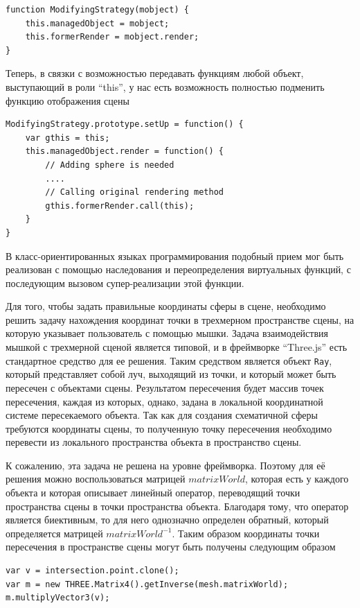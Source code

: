 \documentclass[14pt, a4paper]{extarticle}
\begin{document}
\begin{lstlisting}
function ModifyingStrategy(mobject) {
    this.managedObject = mobject;
    this.formerRender = mobject.render;
}
\end{lstlisting}

Теперь, в связки с возможностью передавать функциям любой объект,
выступающий в роли ``this'', у нас есть возможность полностью подменить функцию
отображения сцены

\begin{lstlisting}
ModifyingStrategy.prototype.setUp = function() {
    var gthis = this;
    this.managedObject.render = function() {
        // Adding sphere is needed
        ....
        // Calling original rendering method
        gthis.formerRender.call(this);
    }
}
\end{lstlisting}

В класс-ориентированных языках программирования подобный прием мог быть
реализован с помощью наследования и переопределения
виртуальных функций, с последующим вызовом супер-реализации этой функции.

Для того, чтобы задать правильные координаты сферы в сцене, необходимо решить
задачу нахождения координат точки в трехмерном пространстве сцены, на которую
указывает пользователь с помощью мышки. Задача взаимодействия
мышкой с трехмерной сценой является типовой, и в фреймворке ``Three.js'' есть
стандартное
средство для ее решения. Таким средством является объект \texttt{Ray}, который
представляет собой луч, выходящий из точки, и который может быть пересечен с
объектами сцены. Результатом пересечения будет массив точек пересечения,
каждая из которых, однако, задана в локальной координатной системе пересекаемого
объекта. Так как для создания схематичной сферы требуются координаты сцены, то
полученную точку пересечения необходимо перевести из локального пространства
объекта в пространство сцены.

К сожалению, эта задача не решена на уровне фреймворка. Поэтому для её решения
можно
воспользоваться матрицей $matrixWorld$, которая
есть у каждого объекта и которая описывает линейный оператор, переводящий точки
пространства сцены в точки пространства объекта. Благодаря тому, что оператор
является биективным, то для него однозначно определен обратный, который
определяется матрицей $matrixWorld^{-1}$. Таким образом
координаты точки пересечения в пространстве сцены могут быть получены следующим
образом

\begin{lstlisting}
var v = intersection.point.clone();
var m = new THREE.Matrix4().getInverse(mesh.matrixWorld);
m.multiplyVector3(v);
\end{lstlisting}
\end{document}
